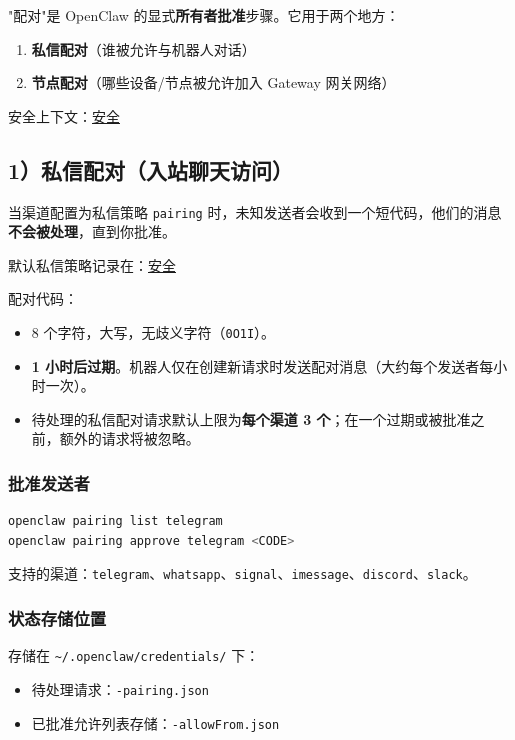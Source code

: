 "配对"是 OpenClaw 的显式\textbf{所有者批准}步骤。它用于两个地方：

\begin{enumerate}
  \item \textbf{私信配对}（谁被允许与机器人对话）
  \item \textbf{节点配对}（哪些设备/节点被允许加入 Gateway 网关网络）
\end{enumerate}


安全上下文：\href{/gateway/security}{安全}

\subsection{1）私信配对（入站聊天访问）}


当渠道配置为私信策略 \texttt{pairing} 时，未知发送者会收到一个短代码，他们的消息\textbf{不会被处理}，直到你批准。

默认私信策略记录在：\href{/gateway/security}{安全}

配对代码：

\begin{itemize}
  \item 8 个字符，大写，无歧义字符（\texttt{0O1I}）。
  \item \textbf{1 小时后过期}。机器人仅在创建新请求时发送配对消息（大约每个发送者每小时一次）。
  \item 待处理的私信配对请求默认上限为\textbf{每个渠道 3 个}；在一个过期或被批准之前，额外的请求将被忽略。
\end{itemize}


\subsubsection{批准发送者}


\begin{lstlisting}[language=bash]
openclaw pairing list telegram
openclaw pairing approve telegram <CODE>
\end{lstlisting}


支持的渠道：\texttt{telegram}、\texttt{whatsapp}、\texttt{signal}、\texttt{imessage}、\texttt{discord}、\texttt{slack}。

\subsubsection{状态存储位置}


存储在 \texttt{\textasciitilde{}/.openclaw/credentials/} 下：

\begin{itemize}
  \item 待处理请求：\texttt{-pairing.json}
  \item 已批准允许列表存储：\texttt{-allowFrom.json}
\end{itemize}


